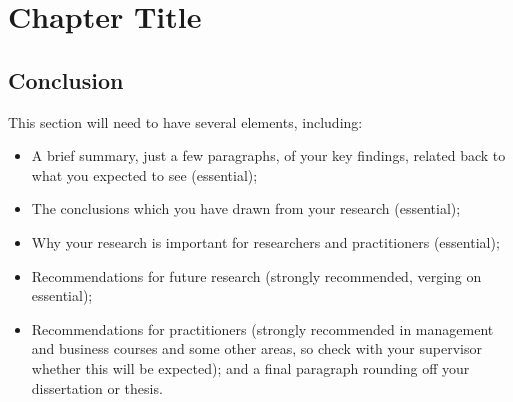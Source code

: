 \chapter{Chapter Title} \label{c7}
\section{Conclusion}
This section will need to have several elements, including:
\begin{itemize}
	\item A brief summary, just a few paragraphs, of your key findings, related back to what you expected to see (essential);
	\item The conclusions which you have drawn from your research (essential);
	\item Why your research is important for researchers and practitioners (essential);
	\item Recommendations for future research (strongly recommended, verging on essential);
	\item Recommendations for practitioners (strongly recommended in management and business courses and some other areas, so check with your supervisor whether this will be expected); and a final paragraph rounding off your dissertation or thesis.
\end{itemize}


